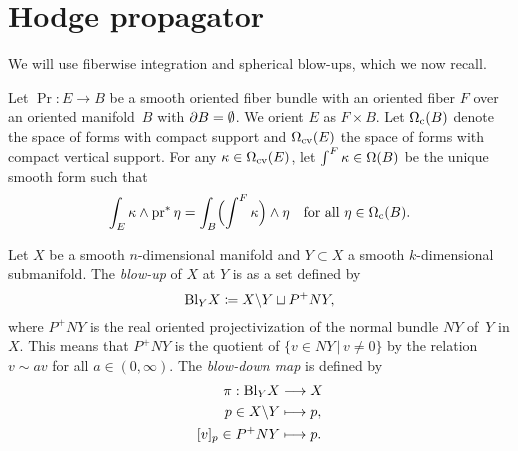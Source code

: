 \documentclass[\MainFolder/Text.tex]{subfiles}
\begin{document}
\section{Hodge propagator} \label{Section:Proof1}


We will use fiberwise integration and spherical blow-ups, which we now recall.


\begin{Definition} \label{Def:FibInt}
Let $\Pr: E \rightarrow B$ be a smooth oriented fiber bundle with an oriented fiber $F$ over an oriented manifold~$B$ with $\partial B = \emptyset$. We orient $E$ as $F\times B$. Let 
$\Omega_{\mathrm{c}} (B)$ denote the space of forms with compact support and $\Omega_{\mathrm{cv}}(E)$ the space of forms with compact vertical support. For any $\kappa\in \Omega_{\mathrm{cv}}(E)$, let $\int^{F} \kappa \in \Omega(B)$ be the unique smooth form such that
\begin{equation*} \label{Eq:FiberInt}
\int_E \kappa \wedge \operatorname{\mathrm{pr}}^*\eta = \int_B \Bigl(\int^{F}\kappa \Bigr) \wedge \eta\quad\text{for all }\eta\in \Omega_{\mathrm{c}} (B).
\end{equation*}
\end{Definition}
 
\begin{Definition} Let $X$ be a smooth $n$-dimensional manifold and $Y\subset X$ a smooth $k$-dimensional submanifold. The \emph{blow-up} of $X$ at $Y$ is as a set defined by
$$ \mathrm{Bl}_Y X \coloneqq X\backslash Y \sqcup P^+N Y, $$
where $P^+N Y$ is the real oriented projectivization of the normal bundle $NY$ of~$Y$ in $X$. This means that $P^+NY$ is the quotient of $\{ v\in NY\,
\vert\, v\neq 0\}$ by the relation $v\sim a v$ for all $a\in (0,\infty)$. The \emph{blow-down map} is defined by
\begin{align*}
 \pi : \mathrm{Bl}_Y X &\longrightarrow X \\
     p\in X\backslash Y &\longmapsto p, \\
     [v]_p\in P^+N Y &\longmapsto p.
\end{align*}
\end{Definition}
\end{document}
